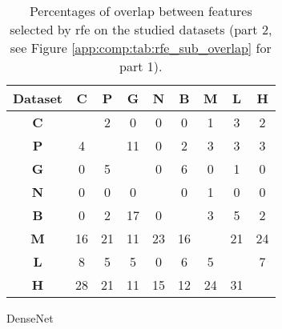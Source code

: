 \begin{table}
  \begin{subtable}[h]{0.45\textwidth}
    \centering
    \begin{tabular}{|c|cccccccc|} 
    \hline
    Dataset & \textbf{C} & \textbf{P} & \textbf{G} & \textbf{N} & \textbf{B} & \textbf{M} & \textbf{L} & \textbf{H}\\
    \hline
    \textbf{C} &   & 2 & 0 & 0 & 0 & 1 & 3 & 2 \\
    \textbf{P} & 4 &   & 11 & 0 & 2 & 3 & 3 & 3 \\
    \textbf{G} & 0 & 5 &   & 0 & 6 & 0 & 1 & 0 \\
    \textbf{N} & 0 & 0 & 0 &   & 0 & 1 & 0 & 0 \\
    \textbf{B} & 0 & 2 & 17 & 0 &   & 3 & 5 & 2 \\
    \textbf{M} & 16 & 21 & 11 & 23 & 16 &   & 21 & 24 \\
    \textbf{L} & 8 & 5 & 5 & 0 & 6 & 5 &   & 7 \\
    \textbf{H} & 28 & 21 & 11 & 15 & 12 & 24 & 31 & \\
    \hline
    \end{tabular}
    \caption{DenseNet}
  \end{subtable}

  \caption{Percentages of overlap between features selected by \acrshort{rfe} on the studied datasets (part 2, see Figure \ref{app:comp:tab:rfe_sub_overlap} for part 1).}
  \label{app:comp:tab:rfe_sub_overlap2}
\end{table}


